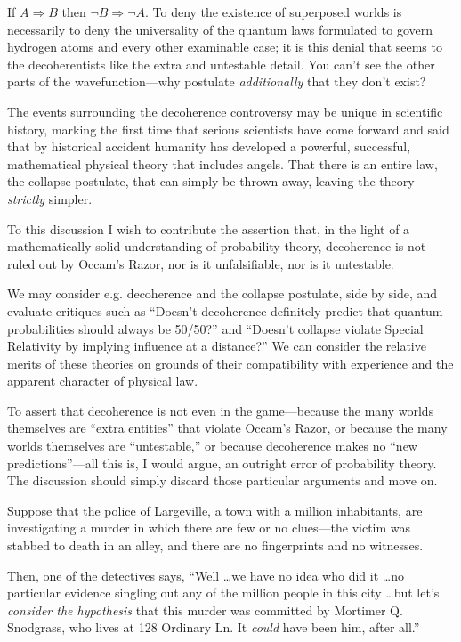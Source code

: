 {
 If $A \Rightarrow B$ then $\lnot B \Rightarrow
 \lnot A$. To deny the existence of superposed worlds is
necessarily to deny the universality of the quantum laws formulated to
govern hydrogen atoms and every other examinable case; it is this
denial that seems to the decoherentists like the extra and untestable
detail. You can't see the other parts of the
wavefunction---why postulate \textit{additionally} that they
don't exist?}

{
 The events surrounding the decoherence controversy may be unique
in scientific history, marking the first time that serious scientists
have come forward and said that by historical accident humanity has
developed a powerful, successful, mathematical physical theory that
includes angels. That there is an entire law, the collapse postulate,
that can simply be thrown away, leaving the theory \textit{strictly}
simpler.}

{
 To this discussion I wish to contribute the assertion that, in the
light of a mathematically solid understanding of probability theory,
decoherence is not ruled out by Occam's Razor, nor is
it unfalsifiable, nor is it untestable.}

{
 We may consider e.g. decoherence and the collapse postulate, side
by side, and evaluate critiques such as
``Doesn't decoherence definitely
predict that quantum probabilities should always be
50/50?'' and
``Doesn't collapse violate Special
Relativity by implying influence at a distance?'' We
can consider the relative merits of these theories on grounds of their
compatibility with experience and the apparent character of physical
law.}

{
 To assert that decoherence is not even in the game---because the
many worlds themselves are ``extra
entities'' that violate Occam's
Razor, or because the many worlds themselves are
``untestable,'' or because
decoherence makes no ``new
predictions''---all this is, I would argue, an
outright error of probability theory. The discussion should simply
discard those particular arguments and move on.}

\myendsectiontext


{
 Suppose that the police of Largeville, a town with a million
inhabitants, are investigating a murder in which there are few or no
clues---the victim was stabbed to death in an alley, and there are no
fingerprints and no witnesses. }

{
 Then, one of the detectives says, ``Well \ldots we
have no idea who did it \ldots no particular evidence singling out any
of the million people in this city \ldots but let's
\textit{consider the hypothesis} that this murder was committed by
Mortimer Q. Snodgrass, who lives at 128 Ordinary Ln. It \textit{could}
have been him, after all.''}

